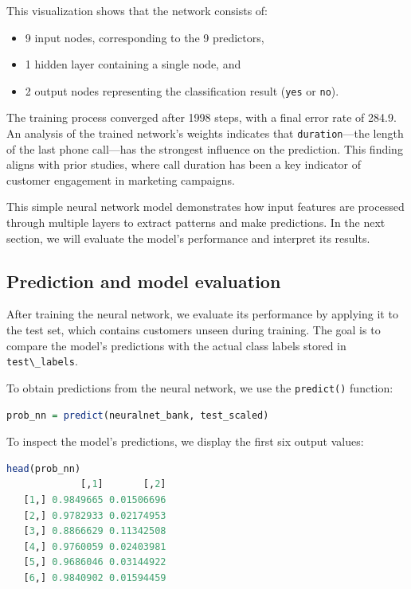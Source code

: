 \documentclass[
]{book}
\newcommand{\passthrough}[1]{#1}
\providecommand{\tightlist}{%
  \setlength{\itemsep}{0pt}\setlength{\parskip}{0pt}}
\theoremstyle{definition}
\theoremstyle{definition}
\theoremstyle{definition}
\theoremstyle{definition}
\theoremstyle{remark}
\begin{document}
This visualization shows that the network consists of:

\begin{itemize}
\tightlist
\item
  9 input nodes, corresponding to the 9 predictors,\\
\item
  1 hidden layer containing a single node, and\\
\item
  2 output nodes representing the classification result (\passthrough{\lstinline!yes!} or \passthrough{\lstinline!no!}).
\end{itemize}

The training process converged after 1998 steps, with a final error rate of 284.9. An analysis of the trained network's weights indicates that \passthrough{\lstinline!duration!}---the length of the last phone call---has the strongest influence on the prediction. This finding aligns with prior studies, where call duration has been a key indicator of customer engagement in marketing campaigns.

This simple neural network model demonstrates how input features are processed through multiple layers to extract patterns and make predictions. In the next section, we will evaluate the model's performance and interpret its results.

\subsection*{Prediction and model evaluation}\label{prediction-and-model-evaluation-2}

After training the neural network, we evaluate its performance by applying it to the test set, which contains customers unseen during training. The goal is to compare the model's predictions with the actual class labels stored in \passthrough{\lstinline!test\_labels!}.

To obtain predictions from the neural network, we use the \passthrough{\lstinline!predict()!} function:

\begin{lstlisting}[language=R]
prob_nn = predict(neuralnet_bank, test_scaled)
\end{lstlisting}

To inspect the model's predictions, we display the first six output values:

\begin{lstlisting}[language=R]
head(prob_nn)
             [,1]       [,2]
   [1,] 0.9849665 0.01506696
   [2,] 0.9782933 0.02174953
   [3,] 0.8866629 0.11342508
   [4,] 0.9760059 0.02403981
   [5,] 0.9686046 0.03144922
   [6,] 0.9840902 0.01594459
\end{lstlisting}
\end{document}
